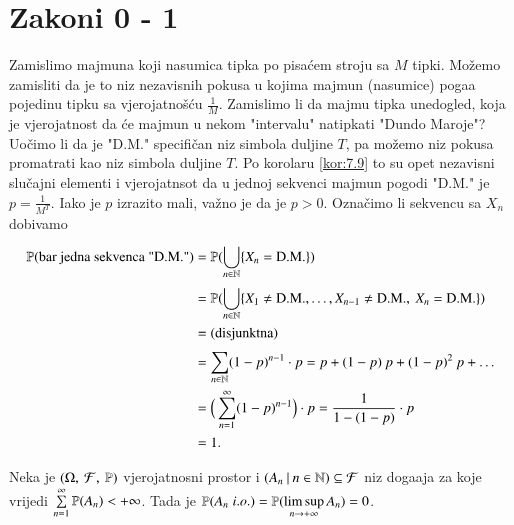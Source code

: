 
\chapter{Zakoni 0 - 1}  \label{zakoni_01}

\begin{pr}  \label{pr:9.1}
    Zamislimo majmuna koji nasumica tipka po pisa\' cem stroju sa $M$ tipki.
    Mo\v zemo zamisliti da je to niz nezavisnih pokusa u kojima majmun (nasumice) poga\dj a pojedinu tipku sa vjerojatno\v s\' cu $\frac{1}{M}$.
    Zamislimo li da majmu tipka unedogled, koja je vjerojatnost da \' ce majmun u nekom "intervalu" natipkati "Dundo Maroje"?
    Uo\v cimo li da je "D.M." specifi\v can niz simbola duljine $T$, pa mo\v zemo niz pokusa promatrati kao niz simbola duljine $T$.
    Po korolaru \ref{kor:7.9} to su opet nezavisni slu\v cajni elementi i vjerojatnsot da u jednoj sekvenci majmun pogodi "D.M." je $p = \frac{1}{M^T}$.
    Iako je $p$ izrazito mali, va\v zno je da je $p > 0$.
    Ozna\v cimo li sekvencu sa $X_n$ dobivamo
    \begin{equation*}
        \begin{aligned}
            \mathbb{P}({\textnormal{bar jedna sekvenca "D.M."}})
            &= \mathbb{P}({\bigcup\limits_{n \in \mathbb{N}}^{} \{X_n = \textnormal{D.M.}\}})\\
            &= \mathbb{P}({\bigcup\limits_{n \in \mathbb{N}}^{} \{X_1 \neq \textnormal{D.M.}, \ldots, X_{n-1} \neq \textnormal{D.M.}, \: X_n = \textnormal{D.M.}\}})\\
            &= \textnormal{(disjunktna)}\\
            &= \sum\limits_{n \in \mathbb{N}}^{} (1 - p)^{n - 1} \cdot p = p + (1 - p) \: p + (1 - p)^2 \: p + \ldots\\
            &= \Big( \sum\limits_{n = 1}^{\infty} (1 - p)^{n - 1} \Big) \cdot p = \frac{1}{1 - (1 - p)} \cdot p\\
            &= 1.
        \end{aligned}
    \end{equation*}
\end{pr}

\begin{lm}  \label{lm:9.2}
    Neka je $(\Omega, \: \mathcal{F}, \: \mathbb{P})$ vjerojatnosni prostor i $({A_n} \: | \: {n \in \mathbb{N}}) \subseteq \mathcal{F}$ niz doga\dj aja za koje vrijedi $\sum\limits_{n = 1}^{\infty} \mathbb{P}({A_n}) < +\infty$.
    Tada je $\mathbb{P}({A_n \; i.o.}) = \mathbb{P}({\limsup\limits_{n \to +\infty} A_n}) = 0$.
\end{lm}

